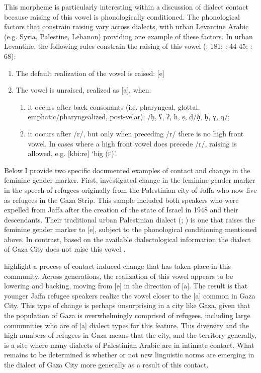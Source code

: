 \documentclass[output=paper]{langsci/langscibook}
\begin{document}
  This morpheme is particularly interesting within a discussion of dialect contact because raising of this vowel is phonologically conditioned. The phonological factors that constrain raising vary across dialects, with urban Levantine Arabic (e.g. Syria, Palestine, Lebanon) providing one example of these factors. In urban Levantine, the following rules constrain the raising of this vowel (\citealt{Grotzfeld1980}: 181; \citealt{Levin1994}: 44-45; \citealt{Al-Wer2007}: 68):
\begin{enumerate}
    \item The default realization of the vowel is raised: [e]
    \item The vowel is unraised, realized as [a], when:
    \begin{enumerate}
        \item   it occurs after back consonants (i.e. pharyngeal, glottal,   emphatic/pharyngealized, post-velar): /ḥ, ʕ, ʔ, h, ṣ, ḍ/ð̣, ḫ, ɣ, q/;
        \item   it occurs after /r/, but only when preceding /r/ there is no   high front vowel. In cases where a high front vowel does   precede /r/, raising is allowed, e.g. [kbi:re] ‘big (\textsc{f})’.
    \end{enumerate}
\end{enumerate}

Below I provide two specific documented examples of contact and change in the feminine gender marker. First, \citet{CotterHoresh2015} investigated change in the feminine gender marker in the speech of refugees originally from the Palestinian city of Jaffa who now live as refugees in the Gaza Strip. This sample included both speakers who were expelled from Jaffa after the creation of the state of Israel in 1948 and their descendants. Their traditional urban Palestinian dialect (\citealt{Horesh2000}; \citealt{Shahin2011}) is one that raises the feminine gender marker to [e], subject to the phonological conditioning mentioned above. In contrast, based on the available dialectological information the dialect of Gaza City does not raise this vowel \citep{Bergsträßer1915}. 

\citet{CotterHoresh2015} highlight a process of contact-induced change that has taken place in this community. Across generations, the realization of this vowel appears to be lowering and backing, moving from [e] in the direction of [a]. The result is that younger Jaffa refugee speakers realize the vowel closer to the [a] common in Gaza City. This type of change is perhaps unsurprising in a city like Gaza, given that the population of Gaza is overwhelmingly comprised of refugees, including large communities who are of [a] dialect types for this feature. This diversity and the high numbers of refugees in Gaza means that the city, and the territory generally, is a site where many dialects of Palestinian Arabic are in intimate contact. What remains to be determined is whether or not new linguistic norms are emerging in the dialect of Gaza City more generally as a result of this contact.
\end{document}
